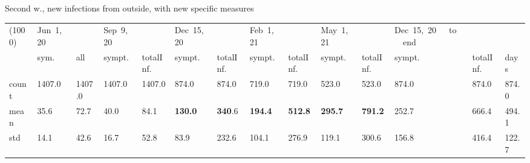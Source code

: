 \documentclass[8pt]{beamer}
\begin{document}
\begin{frame}{Second w., new infections from outside, with new specific measures}
\begin{table}[H]
\center
\tiny
\begin{tabular}{p{0.3cm}p{0.3cm}p{0.3cm}p{0.3cm}p{0.3cm}p{0.3cm}p{0.3cm}p{0.3cm}p{0.3cm}p{0.3cm}p{0.3cm}p{0.3cm}p{0.3cm}p{0.4cm}}
\toprule
(1000) &  Jun~1,~20 & &  Sep~9,~20 & & Dec~15,~20 & & Feb~1,~21 & & May~1,~21 & & Dec~15,~20~~~to~~~end   \\
{} &  sym. &  all &  sympt. &  totalInf. &  sympt. &  totalInf. &  sympt. &  totalInf. &  sympt. &  totalInf. &  sympt. &  totalInf.  & days\\
\midrule
count &   1407.0 &                     1407.0 &   1407.0 &                     1407.0 &    874.0 &                      874.0 &    719.0 &                      719.0 &    523.0 &                      523.0 &              874.0 &                   874.0 &  874.0 \\
mean  &     35.6 &                       72.7 &     40.0 &                       84.1 &    \textbf{130.0} &                      \textbf{340}.6 &    \textbf{194.4} &                      \textbf{512.8} &    \textbf{295.7} &                      \textbf{791.2} &               252.7 &                   666.4 &  494.1 \\
std   &     14.1 &                       42.6 &     16.7 &                       52.8 &     83.9 &                      232.6 &    104.1 &                      276.9 &    119.1 &                      300.6 &               156.8 &                   416.4 &  122.7 \\
\bottomrule
\end{tabular}

\label{selSpontWave2Contr2Tab}
\end{table}


\end{frame}
\end{document}
